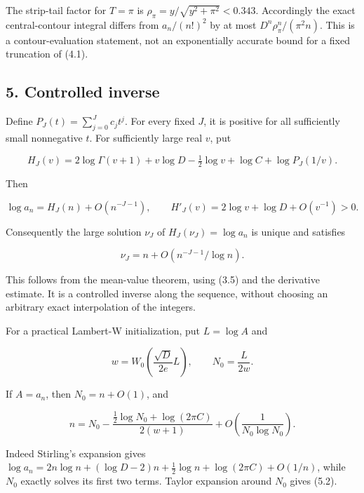 \documentclass[11pt,letterpaper]{article}
\numberwithin{equation}{subsection}
\theoremstyle{definition}
\theoremstyle{remark}
\theoremstyle{plain}
\begin{document}
The strip-tail factor for \(T=\pi\) is \(\rho_\pi=y/\sqrt{y^2+\pi^2}<0.343\). Accordingly the exact central-contour integral differs from \(a_n/(n!)^2\) by at most \(D^n\rho_\pi^n/(\pi^2 n)\). This is a contour-evaluation statement, not an exponentially accurate bound for a fixed truncation of (4.1).

\subsection{5. Controlled inverse}\label{a122:controlled-inverse}

Define \(P_J(t)=\sum_{j=0}^J c_jt^j\). For every fixed \(J\), it is positive for all sufficiently small nonnegative \(t\). For sufficiently large real \(v\), put

\[
 H_J(v)=2\log\Gamma(v+1)+v\log D-\tfrac12\log v+\log C+\log P_J(1/v).
\]

Then

\[
 \log a_n=H_J(n)+O(n^{-J-1}),\qquad
 H'_J(v)=2\log v+\log D+O(v^{-1})>0.
\]

Consequently the large solution \(\nu_J\) of \(H_J(\nu_J)=\log a_n\) is unique and satisfies

\[
 \boxed{\nu_J=n+O(n^{-J-1}/\log n).}\tag{5.1}
\]

This follows from the mean-value theorem, using (3.5) and the derivative estimate. It is a controlled inverse along the sequence, without choosing an arbitrary exact interpolation of the integers.

For a practical Lambert-W initialization, put \(L=\log A\) and

\[
 w=W_0\left(\frac{\sqrt D}{2e}L\right),\qquad N_0=\frac{L}{2w}.
\]

If \(A=a_n\), then \(N_0=n+O(1)\), and

\[
 n=N_0-\frac{\tfrac12\log N_0+\log(2\pi C)}{2(w+1)}
 +O\left(\frac1{N_0\log N_0}\right).\tag{5.2}
\]

Indeed Stirling's expansion gives \(\log a_n=2n\log n+(\log D-2)n+\frac12\log n+\log(2\pi C)+O(1/n)\), while \(N_0\) exactly solves its first two terms. Taylor expansion around \(N_0\) gives (5.2).
\end{document}
